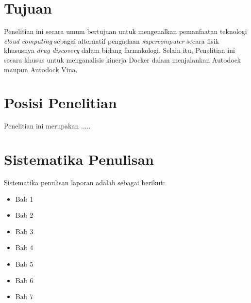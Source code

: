 \section{Tujuan}
Penelitian ini secara umum bertujuan untuk mengenalkan pemanfaatan teknologi \textit{cloud computing}
sebagai alternatif pengadaan \textit{supercomputer} secara fisik khususnya \textit{drug discovery}
dalam bidang farmakologi. Selain itu, Penelitian ini secara khusus untuk menganalisis kinerja Docker
dalam menjalankan Autodock maupun Autodock Vina.


\section{Posisi Penelitian}
Penelitian ini merupakan .....

\section{Sistematika Penulisan}
Sistematika penulisan laporan adalah sebagai berikut:
\begin{itemize}
	\item Bab 1 \babSatu \\
	\item Bab 2 \babDua \\
	\item Bab 3 \babTiga \\
	\item Bab 4 \babEmpat \\
	\item Bab 5 \babLima \\
	\item Bab 6 \babEnam \\
	\item Bab 7 \kesimpulan \\
\end{itemize}


